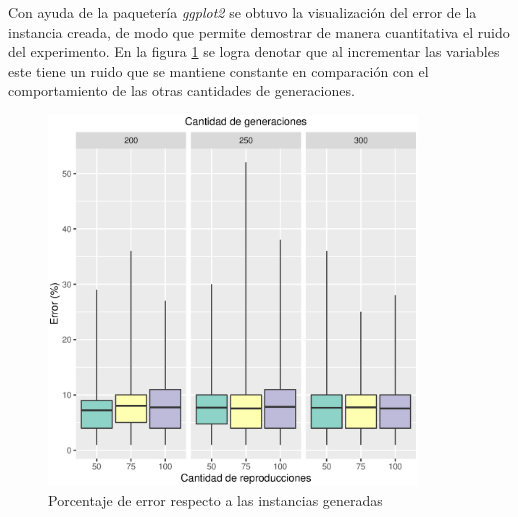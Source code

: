 \documentclass[12pt, letterpaper] {article}
\begin{document}
Con ayuda de la paquetería \textit{ggplot2} \cite{gg2} se obtuvo la visualización del error de la instancia creada, de modo que permite demostrar de manera cuantitativa el ruido del experimento. En la figura \ref{Perror} se logra denotar que al incrementar las variables este tiene un ruido que se mantiene constante en comparación con el comportamiento de las otras cantidades de generaciones. 

\begin{figure}[H]
\centering\includegraphics[width=98mm]{PError.eps}
\caption{Porcentaje de error respecto a las instancias generadas}
\label{Perror}
\end{figure}





\end{document}
